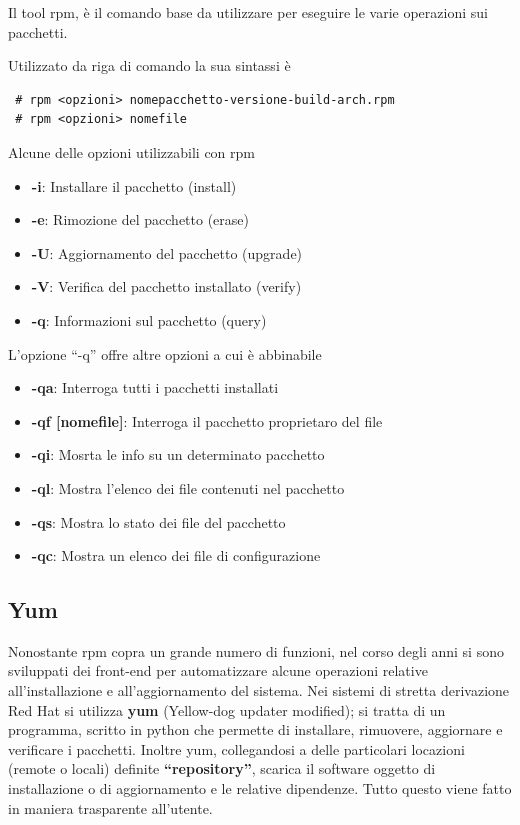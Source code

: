 Il tool rpm, è il comando base da utilizzare per eseguire le varie operazioni sui pacchetti. 

Utilizzato da riga di comando la sua sintassi è

\begin{verbatim}
 # rpm <opzioni> nomepacchetto-versione-build-arch.rpm
 # rpm <opzioni> nomefile
\end{verbatim}

Alcune delle opzioni utilizzabili con rpm

\begin{itemize}
 \item \textbf{-i}: Installare il pacchetto (install)
 \item \textbf{-e}: Rimozione del pacchetto (erase)
 \item \textbf{-U}: Aggiornamento del pacchetto (upgrade)
 \item \textbf{-V}: Verifica del pacchetto installato (verify)
 \item \textbf{-q}: Informazioni sul pacchetto (query)
\end{itemize}

L'opzione ``-q'' offre altre opzioni a cui è abbinabile

\begin{itemize}
 \item \textbf{-qa}: Interroga tutti i pacchetti installati
 \item \textbf{-qf [nomefile]}: Interroga il pacchetto proprietaro del file
 \item \textbf{-qi}: Mosrta le info su un determinato pacchetto
 \item \textbf{-ql}: Mostra l'elenco dei file contenuti nel pacchetto
 \item \textbf{-qs}: Mostra lo stato dei file del pacchetto
 \item \textbf{-qc}: Mostra un elenco dei file di configurazione
\end{itemize}

\subsection{Yum}

Nonostante rpm copra un grande numero di funzioni, nel corso degli anni si sono sviluppati dei front-end per automatizzare alcune operazioni relative all'installazione e all'aggiornamento del sistema. 
Nei sistemi di stretta derivazione Red Hat si utilizza \textbf{yum} (Yellow-dog updater modified); si tratta di un programma, scritto in python che permette di installare, rimuovere, aggiornare e verificare i pacchetti. Inoltre yum, collegandosi a delle particolari locazioni (remote o locali) definite \textbf{``repository''}, scarica il software oggetto di installazione o di aggiornamento e le relative dipendenze. Tutto questo viene fatto in maniera trasparente all'utente.

